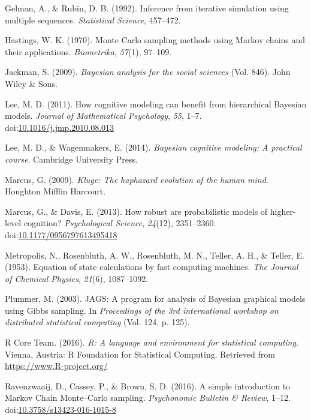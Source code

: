 \documentclass[english,floatsintext,man]{apa6}
\begin{document}
\hypertarget{ref-gelman1992inference}{}
Gelman, A., \& Rubin, D. B. (1992). Inference from iterative simulation
using multiple sequences. \emph{Statistical Science}, 457--472.

\hypertarget{ref-hastings1970monte}{}
Hastings, W. K. (1970). Monte Carlo sampling methods using Markov chains
and their applications. \emph{Biometrika}, \emph{57}(1), 97--109.

\hypertarget{ref-jackman2009bayesian}{}
Jackman, S. (2009). \emph{Bayesian analysis for the social sciences}
(Vol. 846). John Wiley \& Sons.

\hypertarget{ref-lee2011cognitive}{}
Lee, M. D. (2011). How cognitive modeling can benefit from hierarchical
Bayesian models. \emph{Journal of Mathematical Psychology}, \emph{55},
1--7.
doi:\href{https://doi.org/10.1016/j.jmp.2010.08.013}{10.1016/j.jmp.2010.08.013}

\hypertarget{ref-lee2014bayesian}{}
Lee, M. D., \& Wagenmakers, E. (2014). \emph{Bayesian cognitive
modeling: A practical course}. Cambridge University Press.

\hypertarget{ref-marcus2009kluge}{}
Marcus, G. (2009). \emph{Kluge: The haphazard evolution of the human
mind}. Houghton Mifflin Harcourt.

\hypertarget{ref-marcus2013robust}{}
Marcus, G., \& Davis, E. (2013). How robust are probabilistic models of
higher-level cognition? \emph{Psychological Science}, \emph{24}(12),
2351--2360.
doi:\href{https://doi.org/10.1177/0956797613495418}{10.1177/0956797613495418}

\hypertarget{ref-metropolis1953equation}{}
Metropolis, N., Rosenbluth, A. W., Rosenbluth, M. N., Teller, A. H., \&
Teller, E. (1953). Equation of state calculations by fast computing
machines. \emph{The Journal of Chemical Physics}, \emph{21}(6),
1087--1092.

\hypertarget{ref-plummer2003jags}{}
Plummer, M. (2003). JAGS: A program for analysis of Bayesian graphical
models using Gibbs sampling. In \emph{Proceedings of the 3rd
international workshop on distributed statistical computing} (Vol. 124,
p. 125).

\hypertarget{ref-R-base}{}
R Core Team. (2016). \emph{R: A language and environment for statistical
computing}. Vienna, Austria: R Foundation for Statistical Computing.
Retrieved from \url{https://www.R-project.org/}

\hypertarget{ref-ravenzwaaij2016simple}{}
Ravenzwaaij, D., Cassey, P., \& Brown, S. D. (2016). A simple
introduction to Markov Chain Monte--Carlo sampling. \emph{Psychonomic
Bulletin \& Review}, 1--12.
doi:\href{https://doi.org/10.3758/s13423-016-1015-8}{10.3758/s13423-016-1015-8}
\end{document}
